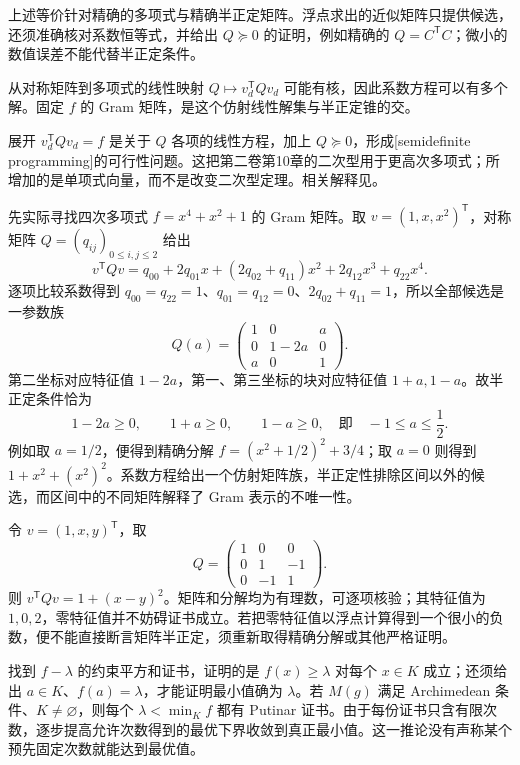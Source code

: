 上述等价针对精确的多项式与精确半正定矩阵。浮点求出的近似矩阵只提供候选，还须准确核对系数恒等式，并给出 \(Q\succeq0\) 的证明，例如精确的 \(Q=C^{\mathsf T}C\)；微小的数值误差不能代替半正定条件。

从对称矩阵到多项式的线性映射 \(Q\longmapsto v_d^{\mathsf T}Qv_d\) 可能有核，因此系数方程可以有多个解。固定 \(f\) 的 Gram 矩阵，是这个仿射线性解集与半正定锥的交。

展开 \(v_d^{\mathsf T}Qv_d=f\) 是关于 \(Q\) 各项的线性方程，加上 \(Q\succeq0\)，形成[semidefinite programming]的可行性问题。这把第二卷第10章的二次型用于更高次多项式；所增加的是单项式向量，而不是改变二次型定理。相关解释见\cite[Sections 7.1 and 7.3]{Sturmfels2002PolynomialEquations}。

\ProseParagraphBreak
先实际寻找四次多项式 \(f=x^4+x^2+1\) 的 Gram 矩阵。取 \(v=(1,x,x^2)^{\mathsf T}\)，对称矩阵 \(Q=(q_{ij})_{0\le i,j\le2}\) 给出
\[
	v^{\mathsf T}Qv =q_{00}+2q_{01}x+(2q_{02}+q_{11})x^2+2q_{12}x^3+q_{22}x^4.
\]
逐项比较系数得到 \(q_{00}=q_{22}=1\)、\(q_{01}=q_{12}=0\)、\(2q_{02}+q_{11}=1\)，所以全部候选是一参数族
\[
	Q(a)=\begin{pmatrix}1&0&a\\0&1-2a&0\\a&0&1\end{pmatrix}.
\]
第二坐标对应特征值 \(1-2a\)，第一、第三坐标的块对应特征值 \(1+a,1-a\)。故半正定条件恰为
\[
	1-2a\ge0,\qquad1+a\ge0,\qquad1-a\ge0, \quad\text{即}\quad -1\le a\le\frac12.
\]
例如取 \(a=1/2\)，便得到精确分解 \(f=(x^2+1/2)^2+3/4\)；取 \(a=0\) 则得到 \(1+x^2+(x^2)^2\)。系数方程给出一个仿射矩阵族，半正定性排除区间以外的候选，而区间中的不同矩阵解释了 Gram 表示的不唯一性。

\begin{example}\label{b3:exm:exact-gram}
	令 \(v=(1,x,y)^{\mathsf T}\)，取
	\[
		Q=\begin{pmatrix}1&0&0\\0&1&-1\\0&-1&1\end{pmatrix}.
	\]
	则 \(v^{\mathsf T}Qv=1+(x-y)^2\)。矩阵和分解均为有理数，可逐项核验；其特征值为 \(1,0,2\)，零特征值并不妨碍证书成立。若把零特征值以浮点计算得到一个很小的负数，便不能直接断言矩阵半正定，须重新取得精确分解或其他严格证明。
\end{example}

找到 \(f-\lambda\) 的约束平方和证书，证明的是 \(f(x)\ge\lambda\) 对每个 \(x\in K\) 成立；还须给出 \(a\in K\)、\(f(a)=\lambda\)，才能证明最小值确为 \(\lambda\)。若 \(M(g)\) 满足 Archimedean 条件、\(K\ne\varnothing\)，则每个 \(\lambda<\min_Kf\) 都有 Putinar 证书。由于每份证书只含有限次数，逐步提高允许次数得到的最优下界收敛到真正最小值。这一推论没有声称某个预先固定次数就能达到最优值。

